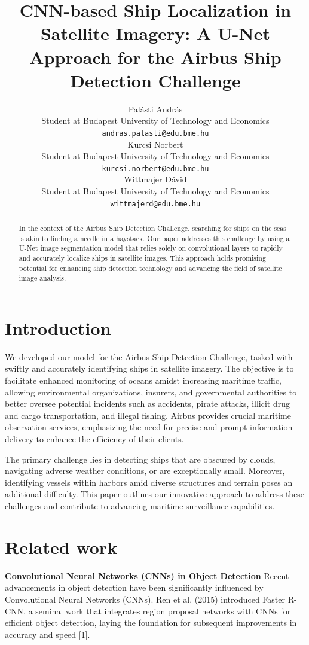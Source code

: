 \documentclass{article}
\title{CNN-based Ship Localization in Satellite Imagery: A U-Net Approach for the Airbus Ship Detection Challenge}
\author{%
  Palásti András \\
  Student at Budapest University of Technology and Economics \\
  \texttt{andras.palasti@edu.bme.hu} \\
  \And
  Kurcsi Norbert \\
  Student at Budapest University of Technology and Economics \\
  \texttt{kurcsi.norbert@edu.bme.hu} \\
  \And
  Wittmajer Dávid \\
  Student at Budapest University of Technology and Economics \\
  \texttt{wittmajerd@edu.bme.hu} \\
}
\begin{document}
\maketitle


\begin{abstract}
  In the context of the Airbus Ship Detection Challenge, searching for ships
  on the seas is akin to finding a needle in a haystack. Our paper addresses 
  this challenge by using a U-Net image segmentation model that relies 
  solely on convolutional layers to rapidly and accurately localize ships in 
  satellite images. This approach holds promising potential for enhancing ship
  detection technology and advancing the field of satellite image analysis.
\end{abstract}


\section{Introduction}


We developed our model for the Airbus Ship Detection Challenge, tasked with
swiftly and accurately identifying ships in satellite imagery. The objective is
to facilitate enhanced monitoring of oceans amidst increasing maritime traffic,
allowing environmental organizations, insurers, and governmental authorities to
better oversee potential incidents such as accidents, pirate attacks, illicit drug
and cargo transportation, and illegal fishing. Airbus provides crucial maritime
observation services, emphasizing the need for precise and prompt information delivery
to enhance the efficiency of their clients. 

The primary challenge lies in detecting ships that are obscured by clouds, navigating
adverse weather conditions, or are exceptionally small. Moreover, identifying vessels within
harbors amid diverse structures and terrain poses an additional difficulty. This paper
outlines our innovative approach to address these challenges and contribute to advancing
maritime surveillance capabilities.


\section{Related work}


\textbf{Convolutional Neural Networks (CNNs) in Object Detection}
Recent advancements in object detection have been significantly influenced by Convolutional
Neural Networks (CNNs). Ren et al. (2015) introduced Faster R-CNN, a seminal work that
integrates region proposal networks with CNNs for efficient object detection, laying the
foundation for subsequent improvements in accuracy and speed [1].
\end{document}
